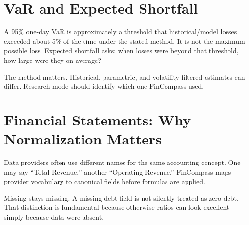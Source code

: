 \documentclass[11pt]{article}
\begin{document}
\section{VaR and Expected Shortfall}
A 95\% one-day VaR is approximately a threshold that historical/model losses exceeded about 5\% of the time under the stated method. It is not the maximum possible loss. Expected shortfall asks: when losses were beyond that threshold, how large were they on average?

The method matters. Historical, parametric, and volatility-filtered estimates can differ. Research mode should identify which one FinCompass used.

\section{Financial Statements: Why Normalization Matters}
Data providers often use different names for the same accounting concept. One may say ``Total Revenue,'' another ``Operating Revenue.'' FinCompass maps provider vocabulary to canonical fields before formulas are applied.

Missing stays missing. A missing debt field is not silently treated as zero debt. That distinction is fundamental because otherwise ratios can look excellent simply because data were absent.
\end{document}
